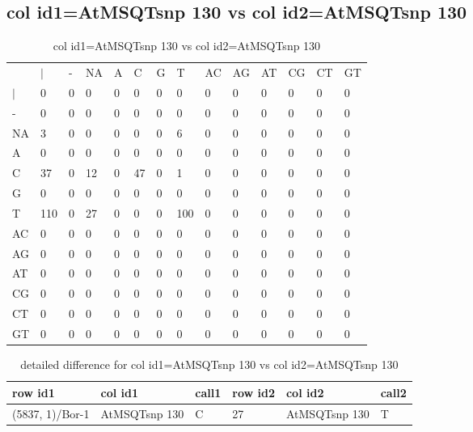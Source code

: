 \subsection{col id1=AtMSQTsnp 130 vs col id2=AtMSQTsnp 130}
\begin{center}
\begin{longtable}{|l|l|l|l|l|l|l|l|l|l|l|l|l|l|}
\caption{col id1=AtMSQTsnp 130 vs col id2=AtMSQTsnp 130} \label{table_dm714}\\
\hline
\\
\hline
&$|$&-&NA&A&C&G&T&AC&AG&AT&CG&CT&GT\\
$|$&0&0&0&0&0&0&0&0&0&0&0&0&0\\
-&0&0&0&0&0&0&0&0&0&0&0&0&0\\
NA&3&0&0&0&0&0&6&0&0&0&0&0&0\\
A&0&0&0&0&0&0&0&0&0&0&0&0&0\\
C&37&0&12&0&47&0&1&0&0&0&0&0&0\\
G&0&0&0&0&0&0&0&0&0&0&0&0&0\\
T&110&0&27&0&0&0&100&0&0&0&0&0&0\\
AC&0&0&0&0&0&0&0&0&0&0&0&0&0\\
AG&0&0&0&0&0&0&0&0&0&0&0&0&0\\
AT&0&0&0&0&0&0&0&0&0&0&0&0&0\\
CG&0&0&0&0&0&0&0&0&0&0&0&0&0\\
CT&0&0&0&0&0&0&0&0&0&0&0&0&0\\
GT&0&0&0&0&0&0&0&0&0&0&0&0&0\\
\hline
\end{longtable}
\end{center}

\begin{center}
\begin{longtable}{|l|l|l|l|l|l|}
\caption{detailed difference for col id1=AtMSQTsnp 130 vs col id2=AtMSQTsnp 130} \label{table_dm715}\\
\hline
row id1&col id1&call1&row id2&col id2&call2\\
\hline
(5837, 1)/Bor-1&AtMSQTsnp 130&C&27&AtMSQTsnp 130&T\\
\hline
\end{longtable}
\end{center}

